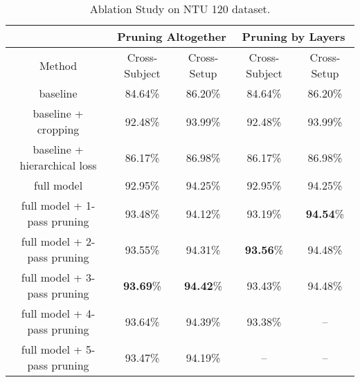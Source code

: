 \documentclass{article}
\begin{document}
\begin{table*}
\begin{center}
\caption{Ablation Study on NTU 120 dataset.}
\label{tbl:NTU_120_ab}
\begin{tabular}{|c|c|c|c|c|}
\hline
 & \multicolumn{2}{c|}{Pruning Altogether} & \multicolumn{2}{c|}{Pruning by Layers}\\
\hline
Method & Cross-Subject & Cross-Setup & Cross-Subject & Cross-Setup \\
\hline
baseline & 84.64\% & 86.20\% & 84.64\% & 86.20\% \\
baseline + cropping & 92.48\% & 93.99\% & 92.48\% & 93.99\% \\
baseline + hierarchical loss & 86.17\% & 86.98\% & 86.17\% & 86.98\% \\
full model & 92.95\% & 94.25\% & 92.95\% & 94.25\% \\
full model + 1-pass pruning & 93.48\% & 94.12\% & 93.19\% & \textbf{94.54}\%\\
full model + 2-pass pruning & 93.55\% & 94.31\% & \textbf{93.56}\% & 94.48\% \\
full model + 3-pass pruning & \textbf{93.69}\% & \textbf{94.42}\% & 93.43\% & 94.48\% \\
full model + 4-pass pruning & 93.64\% & 94.39\% & 93.38\% & --\\
full model + 5-pass pruning & 93.47\% & 94.19\% & -- & --\\
\hline
\end{tabular}
\end{center}
\end{table*}
\end{document}
